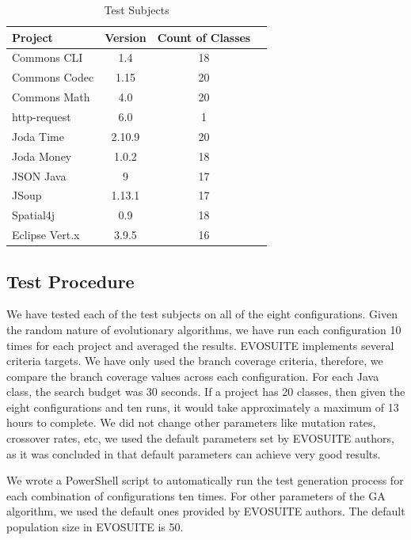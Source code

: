 \documentclass[sigconf]{acmart}
\begin{document}
\begin{table}[t]
  \caption{Test Subjects}
  \label{tab:subjects}
  \begin{tabular}{lccc}
    \toprule
    Project&Version&Count of Classes\\
    \midrule
    Commons CLI   & 1.4    & 18\\
    Commons Codec & 1.15   & 20 \\
    Commons Math  & 4.0    & 20\\
    http-request  & 6.0    & 1 \\
    Joda Time     & 2.10.9 & 20\\
    Joda Money    & 1.0.2  & 18\\
    JSON Java     & 9      & 17\\
    JSoup         & 1.13.1 & 17\\
    Spatial4j     & 0.9    & 18\\
    Eclipse Vert.x& 3.9.5  & 16\\
    \bottomrule
  \end{tabular}
\end{table}


\subsection{Test Procedure}
\label{testproc}
We have tested each of the test subjects on all of the eight configurations. Given the random nature 
of evolutionary algorithms, we have run each configuration 10 times for each project and averaged 
the results. EVOSUITE implements several criteria targets. We have only used the branch coverage 
criteria, therefore, we compare the branch coverage values across each configuration. For each Java 
class, the search budget was 30 seconds. If a project has 20 classes, then given the eight 
configurations and ten runs, it would take approximately a maximum of 13 hours to complete. We did 
not change other parameters like mutation rates, crossover rates, etc, we used 
the default parameters set by EVOSUITE authors, as it was concluded in \cite{Tuning13} that default parameters
can achieve very good results.

We wrote a PowerShell script to automatically run the test generation process for each combination of
configurations ten times. For other parameters of the GA algorithm, we used the default ones provided 
by EVOSUITE authors. The default population size in EVOSUITE is 50.
\end{document}
